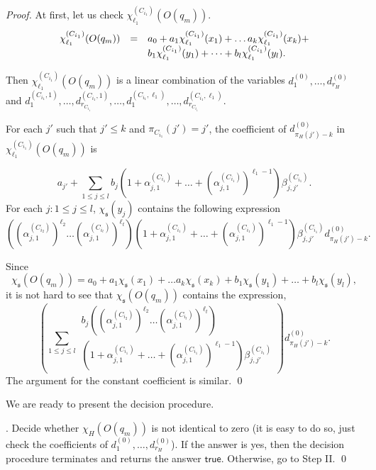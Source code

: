 \documentclass[runningheads,a4paper]{llncs}
\def\schm{{\mathfrak{s} }}
\newcommand\ltrue{\mathsf{true}}
\begin{document}
\begin{proof}
At first,  let us check $\chi^{(C_{i_1})}_{\ell_1}(O(q_m))$.
\[
\begin{array}{l c l}
\chi^{(C_{i_1})}_{\ell_1}(O(q_m)) & = & a_0 + a_1 \chi^{(C_{i_1})}_{\ell_1}(x_1) + \dots a_k \chi^{(C_{i_1})}_{\ell_1}(x_k) + \\
& & b_1 \chi^{(C_{i_1})}_{\ell_1}(y_1) + \dots + b_l \chi^{(C_{i_1})}_{\ell_1}(y_l).
\end{array}
\] 

Then $\chi^{(C_{i_1})}_{\ell_1}(O(q_m))$ is a linear combination of the variables $d^{(0)}_1,\dots, d^{(0)}_{r_H}$ and $d^{(C_{i_1},1)}_1,\dots, d^{(C_{i_1},1)}_{r_{C_{i_1}}}, \dots, d^{(C_{i_1},\ell_1)}_1,\dots, d^{(C_{i_1},\ell_1)}_{r_{C_{i_1}}}$.

For each $j'$ such that $j' \le k$ and $\pi_{C_{i_1}}(j')=j'$, the coefficient of $d^{(0)}_{\pi_H(j')-k}$ in $\chi^{(C_{i_1})}_{\ell_1}(O(q_m))$ is 

\[a_{j'} + \sum \limits_{1 \le j \le l} b_j \left(1+\alpha^{(C_{i_1})}_{j,1} + \dots + (\alpha^{(C_{i_1})}_{j,1})^{\ell_1-1} \right) \beta^{(C_{i_1})}_{j,j'}.\]
%
%
For each $j: 1 \le j \le l$, $\chi_{\schm}(y_j)$ contains the following expression 
\[\left((\alpha^{(C_{i_2})}_{j,1})^{\ell_2} \dots (\alpha^{(C_{i_t})}_{j,1})^{\ell_t}\right)\left(1+\alpha^{(C_{i_1})}_{j,1} + \dots + (\alpha^{(C_{i_1})}_{j,1})^{\ell_1-1} \right) \beta^{(C_{i_1})}_{j,j'} d^{(0)}_{\pi_H(j')-k}.\]

Since 
\[
\chi_{\schm}(O(q_m)) = a_0 + a_1 \chi_{\schm}(x_1) + \dots a_k \chi_{\schm}(x_k) + b_1 \chi_{\schm}(y_1) + \dots + b_l \chi_{\schm}(y_l),
\] 
it is not hard to see that $\chi_\schm(O(q_m))$ contains the expression,
\[
\left(\sum \limits_{1 \le j \le l} 
\begin{array}{l}
b_j \left((\alpha^{(C_{i_2})}_{j,1})^{\ell_2} \dots (\alpha^{(C_{i_t})}_{j,1})^{\ell_t}\right) \\
\left(1+\alpha^{(C_{i_1})}_{j,1} + \dots + (\alpha^{(C_{i_1})}_{j,1})^{\ell_1-1} \right) \beta^{(C_{i_1})}_{j,j'}
\end{array}
\right) d^{(0)}_{\pi_H(j')-k}. 
\]
The argument for the constant coefficient is similar.
\qed
\end{proof}

We are ready to present the decision procedure.

\smallskip

. Decide whether $\chi_H(O(q_m))$ is not identical to zero (it is easy to do so, just check the coefficients of $d^{(0)}_1, \dots, d^{(0)}_{r_H}$). If the answer is yes, then the decision procedure terminates and returns the answer $\ltrue$. Otherwise, go to Step II. \qed
\end{document}
